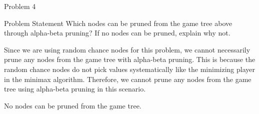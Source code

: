 \begin{problem}{Problem 4}
    \begin{statement}{Problem Statement}
        Which nodes can be pruned from the game tree above through alpha-beta pruning?  If no nodes can be pruned, explain why not.
    \end{statement}

    \clearpage

    \begin{highlight}[Solution]
        Since we are using random chance nodes for this problem, we cannot necessarily prune any nodes from the game tree with alpha-beta pruning. This is because the random chance nodes do not
        pick values systematically like the minimizing player in the minimax algorithm. Therefore, we cannot prune any nodes from the game tree using alpha-beta pruning in this scenario.

        \begin{center}
            \begin{highlightenv}[10cm]
                \begin{center}
                    No nodes can be pruned from the game tree.
                \end{center}
            \end{highlightenv}
        \end{center}
    \end{highlight}
\end{problem}

